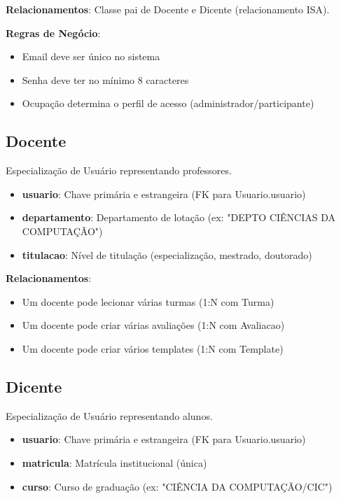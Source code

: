 \documentclass[a4paper,12pt]{article}
\begin{document}
\textbf{Relacionamentos}: Classe pai de Docente e Dicente (relacionamento ISA).

\textbf{Regras de Negócio}:
\begin{itemize}
    \item Email deve ser único no sistema
    \item Senha deve ter no mínimo 8 caracteres
    \item Ocupação determina o perfil de acesso (administrador/participante)
\end{itemize}

\subsection{Docente}

Especialização de Usuário representando professores.

\begin{itemize}
    \item \textbf{usuario}: Chave primária e estrangeira (FK para Usuario.usuario)
    \item \textbf{departamento}: Departamento de lotação (ex: "DEPTO CIÊNCIAS DA COMPUTAÇÃO")
    \item \textbf{titulacao}: Nível de titulação (especialização, mestrado, doutorado)
\end{itemize}

\textbf{Relacionamentos}:
\begin{itemize}
    \item Um docente pode lecionar várias turmas (1:N com Turma)
    \item Um docente pode criar várias avaliações (1:N com Avaliacao)
    \item Um docente pode criar vários templates (1:N com Template)
\end{itemize}

\subsection{Dicente}

Especialização de Usuário representando alunos.

\begin{itemize}
    \item \textbf{usuario}: Chave primária e estrangeira (FK para Usuario.usuario)
    \item \textbf{matricula}: Matrícula institucional (única)
    \item \textbf{curso}: Curso de graduação (ex: "CIÊNCIA DA COMPUTAÇÃO/CIC")
\end{itemize}
\end{document}
